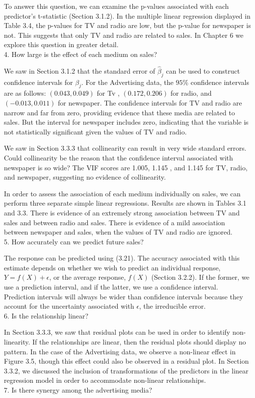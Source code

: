 \documentclass[10pt]{article}
\begin{document}
To answer this question, we can examine the p-values associated with each predictor's t-statistic (Section 3.1.2). In the multiple linear regression displayed in Table 3.4, the p-values for TV and radio are low, but the p-value for newspaper is not. This suggests that only TV and radio are related to sales. In Chapter 6 we explore this question in greater detail.\\
4. How large is the effect of each medium on sales?

We saw in Section 3.1.2 that the standard error of $\hat{\beta}_{j}$ can be used to construct confidence intervals for $\beta_{j}$. For the Advertising data, the $95 \%$ confidence intervals are as follows: $(0.043,0.049)$ for Tv , $(0.172,0.206)$ for radio, and $(-0.013,0.011)$ for newspaper. The confidence intervals for TV and radio are narrow and far from zero, providing evidence that these media are related to sales. But the interval for newspaper includes zero, indicating that the variable is not statistically significant given the values of TV and radio.

We saw in Section 3.3.3 that collinearity can result in very wide standard errors. Could collinearity be the reason that the confidence interval associated with newspaper is so wide? The VIF scores are 1.005, 1.145 , and 1.145 for TV, radio, and newspaper, suggesting no evidence of collinearity.

In order to assess the association of each medium individually on sales, we can perform three separate simple linear regressions. Results are shown in Tables 3.1 and 3.3. There is evidence of an extremely strong association between TV and sales and between radio and sales. There is evidence of a mild association between newspaper and sales, when the values of TV and radio are ignored.\\
5. How accurately can we predict future sales?

The response can be predicted using (3.21). The accuracy associated with this estimate depends on whether we wish to predict an individual response, $Y=f(X)+\epsilon$, or the average response, $f(X)$ (Section 3.2.2). If the former, we use a prediction interval, and if the latter, we use a confidence interval. Prediction intervals will always be wider than confidence intervals because they account for the uncertainty associated with $\epsilon$, the irreducible error.\\
6. Is the relationship linear?

In Section 3.3.3, we saw that residual plots can be used in order to identify non-linearity. If the relationships are linear, then the residual plots should display no pattern. In the case of the Advertising data, we observe a non-linear effect in Figure 3.5, though this effect could also be observed in a residual plot. In Section 3.3.2, we discussed the inclusion of transformations of the predictors in the linear regression model in order to accommodate non-linear relationships.\\
7. Is there synergy among the advertising media?
\end{document}
